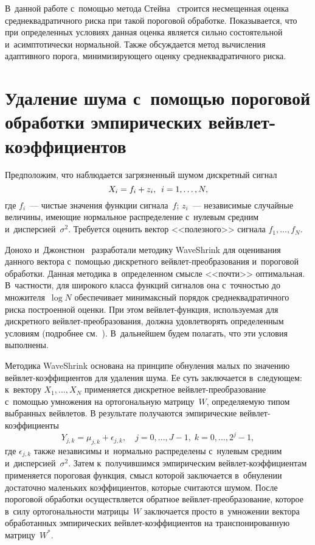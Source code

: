 \begin{multicols}{2}
В~данной работе с~помощью метода Стейна~\cite{S81} строится 
несмещенная оценка среднеквадратичного риска при такой пороговой обработке. 
Показывается, что при определенных условиях данная оценка является сильно 
состоятельной и~асимптотически нормальной. Также обсуждается метод вычисления 
адаптивного порога, минимизирующего оценку среднеквадратичного риска.

\section{Удаление шума с~помощью пороговой обработки эмпирических вейвлет-коэффициентов}

Предположим, что наблюдается загрязненный шумом дискретный сигнал
$$
X_i=f_i+z_i,\enskip i=1,\ldots,N,
$$
где $f_i$~--- чистые значения функции сигнала~$f$; $z_i$~--- независимые 
случайные величины, имеющие нормальное распределение с~нулевым средним 
и~дисперсией~$\sigma^2$. Требуется оценить вектор <<полезного>> сигнала 
$f_1,\ldots,f_N$.

Донохо и~Джонстнон~\cite{DonJ94} разработали методику WaveShrink для оценивания 
данного вектора с~по\-мощью дискретного вейв\-лет-пре\-об\-ра\-зо\-ва\-ния и~пороговой 
обработки. Данная методика в~определенном смысле <<почти>> оптимальная. 
В~част\-ности, для широкого класса функций сигналов она с~точностью до множителя~$\log N$ 
обеспечивает минимаксный порядок среднеквадратичного риска построенной 
оценки. При этом вейв\-лет-функ\-ция, используемая для дискретного вейв\-лет-пре\-об\-ра\-зо\-ва\-ния, 
долж\-на удовле\-тво\-рять определенным условиям (подробнее см.~\cite{Mall99}). В~дальнейшем будем полагать, что эти условия выполнены.

Методика WaveShrink основана на принципе обнуления малых по значению вейв\-лет-ко\-эф\-фи\-ци\-ен\-тов для удаления шума. 
Ее суть заключается в~следующем: к~вектору 
$X_1,\ldots,X_N$ применяется дискретное вейв\-лет-пре\-об\-ра\-зо\-ва\-ние с~по\-мощью 
умножения на ортогональную мат\-ри\-цу~$W$, определяемую типом выбранных вейвлетов.
В результате получаются эмпирические вейв\-лет-ко\-эф\-фи\-ци\-енты
\begin{equation*}
Y_{j,k}=\mu_{j,k}+\epsilon_{j,k},\quad j=0,\ldots,J-1,\;k=0,\ldots,2^{j}-1,
\end{equation*}
где $\epsilon_{j,k}$ также независимы и~нормально распределены с~нулевым средним
 и~дисперсией~$\sigma^2$. Затем к~получившимся эмпирическим вейв\-лет-ко\-эф\-фи\-ци\-ен\-там 
применяется пороговая функция, смысл которой заключается в~обнулении достаточно 
маленьких коэффициентов, которые считаются шумом.
После пороговой обработки осуществляется\linebreak
 обратное вейв\-лет-пре\-об\-ра\-зо\-ва\-ние, 
которое в~\mbox{силу} ортогональности мат\-ри\-цы~$W$ заключается прос\-то в~умножении 
вектора обработанных эмпирических вейв\-лет-ко\-эф\-фи\-ци\-ен\-тов на транспонированную 
мат\-ри\-цу~$W^{*}$.


\end{multicols}
